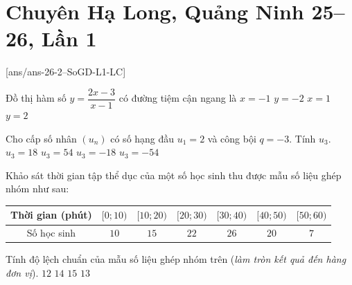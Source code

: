 \section{Chuyên Hạ Long, Quảng Ninh 25--26, Lần 1}

\caulc
{}[ans/ans-26-2--SoGD-L1-LC]



\begin{ex}%
	Đồ thị hàm số $y=\dfrac{2x-3}{x-1}$ có đường tiệm cận ngang là
	\choice
	{$x=-1$}
	{$y=-2$}
	{$x=1$}
	{\True $y=2$}
\end{ex}

\begin{ex}%
	Cho cấp số nhân $(u_n)$ có số hạng đầu $u_1=2$ và công bội $q=-3$. Tính $u_3$.
	\choice
	{\True $u_3=18$}
	{$u_3=54$}
	{$u_3=-18$}
	{$u_3=-54$}
\end{ex}

\begin{ex}%
	Khảo sát thời gian tập thể dục của một số học sinh thu được mẫu số liệu ghép nhóm như sau:
	\begin{center}
		\begin{tabular}{|c|c|c|c|c|c|c|}
			\hline
			Thời gian (phút) & $[0;10)$ & $[10;20)$ & $[20;30)$ & $[30;40)$ & $[40;50)$ & $[50;60)$ \\ \hline
			Số học sinh & $10$ & $15$ & $22$ & $26$ & $20$ & $7$ \\ \hline
		\end{tabular}
	\end{center}
	Tính độ lệch chuẩn của mẫu số liệu ghép nhóm trên (\textit{làm tròn kết quả đến hàng đơn vị}).
	\choice
	{$12$}
	{\True $14$}
	{$15$}
	{$13$}
\end{ex}

